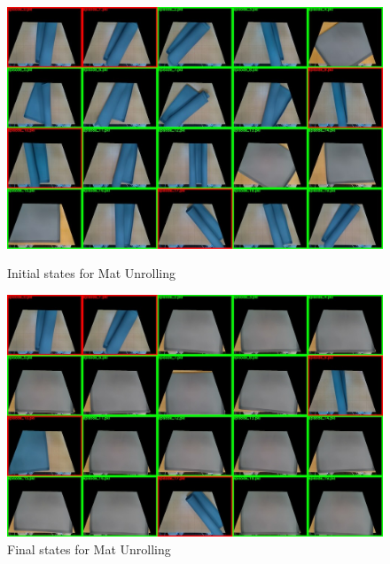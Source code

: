 \documentclass[Afour,sageh,times]{sagej}
\begin{document}
\begin{figure}
    \centering
    \includegraphics[width=\linewidth]{figure/ijrr24_unroll_mat_ini.jpg}
    \caption{Initial states for Mat Unrolling}
    \label{fig:unroll_mat_ini}
    \centering
    \includegraphics[width=\linewidth]{figure/ijrr24_unroll_mat_last.jpg}
    \caption{Final states for Mat Unrolling}
    \label{fig:unroll_mat_last}
\end{figure}
\end{document}
